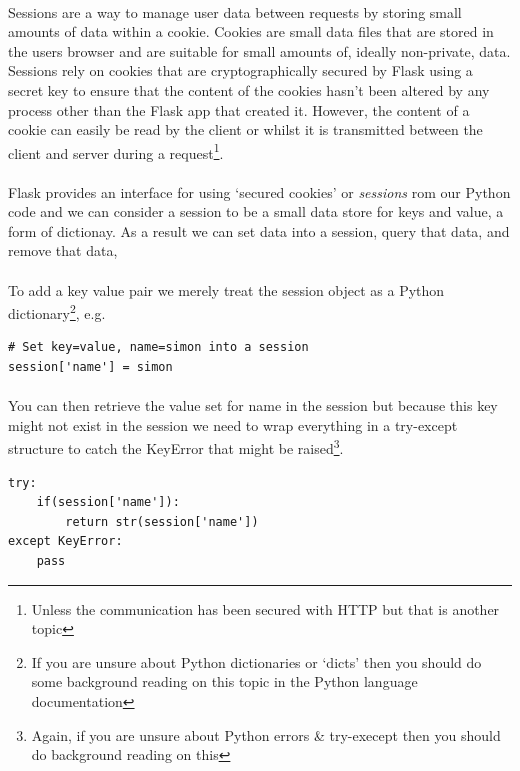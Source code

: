 \documentclass[12pt, a4paper, oneside]{book}
\begin{document}
\paragraph{} Sessions are a way to manage user data between requests by storing small amounts of data within a cookie. Cookies are small data files that are stored in the users browser and are suitable for small amounts of, ideally non-private, data. Sessions rely on cookies that are cryptographically secured by Flask using a secret key to ensure that the content of the cookies hasn't been altered by any process other than the Flask app that created it. However, the content of a cookie can easily be read by the client or whilst it is transmitted between the client and server during a request\footnote{Unless the communication has been secured with HTTP but that is another topic}.

\paragraph{} Flask provides an interface for using `secured cookies' or \emph{sessions} rom our Python code and we can consider a session to be a small data store for keys and value, a form of dictionay. As a result we can set data into a session, query that data, and remove that data, 

\paragraph{} To add a key value pair we merely treat the session object as a Python dictionary\footnote{If you are unsure about Python dictionaries or `dicts' then you should do some background reading on this topic in the Python language documentation}, e.g.
\begin{lstlisting}
# Set key=value, name=simon into a session
session['name'] = simon
\end{lstlisting}

\paragraph{} You can then retrieve the value set for name in the session but because this key might not exist in the session we need to wrap everything in a try-except structure to catch the KeyError that might be raised\footnote{Again, if you are unsure about Python errors \& try-execept then you should do background reading on this}.
\begin{lstlisting}
try:
    if(session['name']):
        return str(session['name'])
except KeyError:
    pass
\end{lstlisting}
\end{document}
